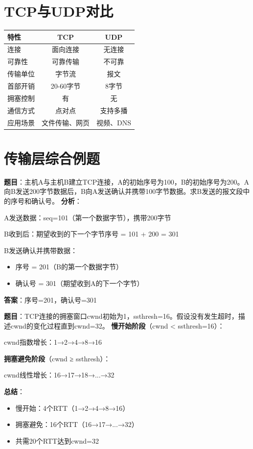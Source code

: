 \section{TCP与UDP对比}
\begin{table}[htbp]
\centering\small
\begin{tabular}{lcc}
\toprule
\textbf{特性} & \textbf{TCP} & \textbf{UDP} \\
\midrule
连接 & 面向连接 & 无连接 \\
可靠性 & 可靠传输 & 不可靠 \\
传输单位 & 字节流 & 报文 \\
首部开销 & 20-60字节 & 8字节 \\
拥塞控制 & 有 & 无 \\
通信方式 & 点对点 & 支持多播 \\
应用场景 & 文件传输、网页 & 视频、DNS \\
\bottomrule
\end{tabular}
\end{table}

\section{传输层综合例题}

\begin{examplebox}[例题5.5 TCP序号计算]
\textbf{题目}：主机A与主机B建立TCP连接，A的初始序号为100，B的初始序号为200。A向B发送200字节数据后，B向A发送确认并携带100字节数据。求B发送的报文段中的序号和确认号。
\tcblower
\textbf{分析}：

A发送数据：seq=101（第一个数据字节），携带200字节

B收到后：期望收到的下一个字节序号 = 101 + 200 = 301

B发送确认并携带数据：
\begin{itemize}[itemsep=0pt]
    \item 序号 = 201（B的第一个数据字节）
    \item 确认号 = 301（期望收到A的下一个字节）
\end{itemize}

\textbf{答案}：序号=201，确认号=301
\end{examplebox}

\begin{examplebox}[例题5.6 拥塞控制过程]
\textbf{题目}：TCP连接的拥塞窗口cwnd初始为1，ssthresh=16。假设没有发生超时，描述cwnd的变化过程直到cwnd=32。
\tcblower
\textbf{慢开始阶段}（cwnd < ssthresh=16）：

cwnd指数增长：1→2→4→8→16

\textbf{拥塞避免阶段}（cwnd ≥ ssthresh）：

cwnd线性增长：16→17→18→...→32

\textbf{总结}：
\begin{itemize}[itemsep=0pt]
    \item 慢开始：4个RTT（1→2→4→8→16）
    \item 拥塞避免：16个RTT（16→17→...→32）
    \item 共需20个RTT达到cwnd=32
\end{itemize}
\end{examplebox}

